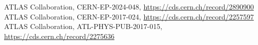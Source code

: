 \documentclass{thesissummary}
\begin{document}
\begin{thebibliography}{99}
 ATLAS Collaboration, CERN-EP-2024-048, \url{https://cds.cern.ch/record/2890900}
 ATLAS Collaboration, CERN-EP-2017-024, \url{https://cds.cern.ch/record/2257597}
 ATLAS Collaboration, ATL-PHYS-PUB-2017-015, \url{https://cds.cern.ch/record/2275636}
%
%
%
%
%
%
%
%
%
%
%
%
%
\end{thebibliography}
\end{document}
